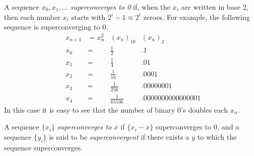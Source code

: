 \documentclass[12pt]{article}
\begin{document}
A sequence $x_0,x_1,\dots$ \emph{superconverges to 0} if, when the $x_i$ are written in base 2, then each number $x_i$ starts with $2^i-1\approx 2^i$ zeroes.
For example, the following sequence is superconverging to 0.
$$\begin{array}{clcl}
x_{n+1}&=x_n^2 & (x_n)_{10} & (x_n)_2\\[1.5pt]
x_0 &= & \frac{1}{2} & .1\\[1.5pt]
x_1 &= & \frac{1}{4} & .01\\[1.5pt]
x_2 &= & \frac{1}{16} & .0001\\[1.5pt]
x_3 &= & \frac{1}{256} & .00000001\\[1.5pt]
x_4 &= & \frac{1}{65536} & .0000000000000001
\end{array}$$
In this case it is easy to see that the number of binary 0's doubles each $x_n$.

A sequence $\{x_i\}$ \emph{superconverges to $x$} if $\{x_i-x\}$ superconverges  to 0, and a sequence $\{y_i\}$ is said to be \emph{superconvergent} if there exists a $y$ to which the sequence superconverges.
\end{document}
